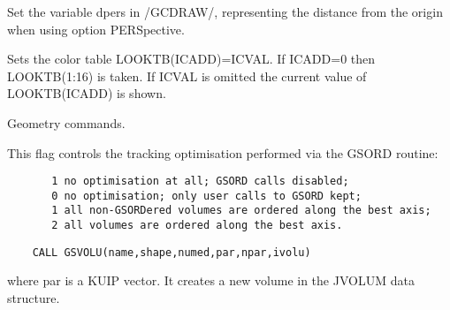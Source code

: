 
\BEGARG
{}
\ENDARG

   \par
Set the variable dpers in /GCDRAW/, representing the distance from the 
   origin when using option PERSpective.  

\ENDCMD


\BEGARG
{}
\ENDARG

   \par
Sets the color table LOOKTB(ICADD)=ICVAL.  If ICADD=0 then LOOKTB(1:16) is 
   taken.  If ICVAL is omitted the current value of LOOKTB(ICADD) is shown.  

\ENDCMD
\newpage
{}
\ifMENUtext
   \par
Geometry commands.  


\fi


\BEGARG
{}
\ENDARG
{}
\ENDOPT

   \par
This flag controls the tracking optimisation performed via the GSORD 
   routine:  
\begin{verbatim}
       1 no optimisation at all; GSORD calls disabled;
       0 no optimisation; only user calls to GSORD kept;
       1 all non-GSORDered volumes are ordered along the best axis;
       2 all volumes are ordered along the best axis.
\end{verbatim}

\ENDCMD


\BEGARG
{}
\ENDARG

\begin{verbatim}
    CALL GSVOLU(name,shape,numed,par,npar,ivolu)
\end{verbatim}
   \par
where par is a KUIP vector.  It creates a new volume in the JVOLUM data 
   structure.  

